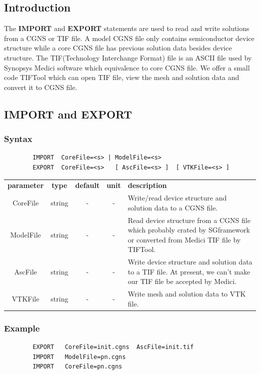\documentclass[11pt,pdftex]{article}
\begin{document}
\subsection{Introduction}
The \textbf{IMPORT} and \textbf{EXPORT} statements are used to read
and write solutions from a CGNS or TIF file. A model CGNS file only
contains semiconductor device structure while a core CGNS file has
previous solution data besides device structure. The TIF(Technology
Interchange Format) file is an ASCII file used by Synopsys Medici
software which equivalence to core CGNS file. We offer a small code
TIFTool which can open TIF file, view the mesh and solution data and
convert it to CGNS file.

\subsection{IMPORT and EXPORT}
\subsubsection*{Syntax}
\begin{verbatim}
        IMPORT  CoreFile=<s> | ModelFile=<s>
        EXPORT  CoreFile=<s>   [ AscFile=<s> ]  [ VTKFile=<s> ]
\end{verbatim}

\small \noindent\begin{longtable}{ccccp{7cm}}
\textbf{parameter}   & \textbf{type}    & \textbf{default} & \textbf{unit} & \textbf{description} \\
CoreFile      & string  & -  & -    & Write/read device structure and solution data to a CGNS file.\\
ModelFile     & string  & -  & -    & Read device structure from a CGNS file which probably crated by SGframework
                                      or converted from Medici TIF file by TIFTool.\\
AscFile       & string  & -  & -    & Write device structure and solution data to a TIF file.
                                      At present, we can't make our TIF file be accepted by Medici.\\
VTKFile       & string  & -  & -    & Write mesh and solution data to VTK file.\\
\end{longtable}
\normalsize

\subsubsection*{Example}
\begin{verbatim}
        EXPORT   CoreFile=init.cgns  AscFile=init.tif
        IMPORT   ModelFile=pn.cgns
        IMPORT   CoreFile=pn.cgns
\end{verbatim}
\end{document}
